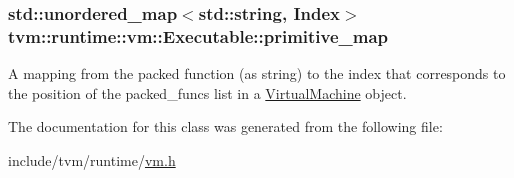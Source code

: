 \subsubsection[{\texorpdfstring{primitive\+\_\+map}{primitive_map}}]{\setlength{\rightskip}{0pt plus 5cm}std\+::unordered\+\_\+map$<$std\+::string, {\bf Index}$>$ tvm\+::runtime\+::vm\+::\+Executable\+::primitive\+\_\+map}\hypertarget{classtvm_1_1runtime_1_1vm_1_1Executable_ab5a31e8670a4f20564abc48610a90e8c}{}\label{classtvm_1_1runtime_1_1vm_1_1Executable_ab5a31e8670a4f20564abc48610a90e8c}


A mapping from the packed function (as string) to the index that corresponds to the position of the {\ttfamily packed\+\_\+funcs} list in a {\ttfamily \hyperlink{classtvm_1_1runtime_1_1vm_1_1VirtualMachine}{Virtual\+Machine}} object. 



The documentation for this class was generated from the following file\+:\begin{DoxyCompactItemize}
\item 
include/tvm/runtime/\hyperlink{vm_8h}{vm.\+h}\end{DoxyCompactItemize}
